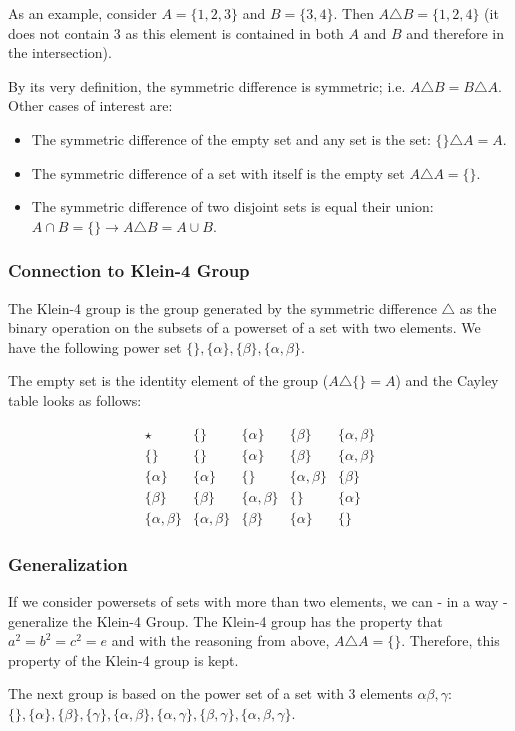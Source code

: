 As an example, consider \(A = \{1,2,3\}\) and \(B = \{3,4\}\). Then
\(A \triangle B = \{1,2,4\}\) (it does not contain \(3\) as this element
is contained in both \(A\) and \(B\) and therefore in the intersection).

By its very definition, the symmetric difference is symmetric; i.e.
\(A \triangle B = B \triangle A\). Other cases of interest are:

\begin{itemize}
\item
  The symmetric difference of the empty set and any set is the set:
  \(\{\} \triangle A = A\).
\item
  The symmetric difference of a set with itself is the empty set
  \(A \triangle A = \{\}\).
\item
  The symmetric difference of two disjoint sets is equal their union:
  \(A \cap B = \{\} \rightarrow A \triangle B = A \cup B\).
\end{itemize}

\subsubsection{Connection to Klein-4
Group}\label{connection-to-klein-4-group}

The Klein-4 group is the group generated by the symmetric difference
\(\triangle\) as the binary operation on the subsets of a powerset of a
set with two elements. We have the following power set
\(\{\}, \{\alpha\}, \{\beta\}, \{\alpha, \beta\}\).

The empty set is the identity element of the group
(\(A \triangle \{\} = A\)) and the Cayley table looks as follows:

\[
\begin{array}{c|cccc}
\star   & \{\}     & \{\alpha \}    & \{\beta\}   & \{\alpha, \beta\}     \\
\hline
\{\}       & \{\}     & \{\alpha\}    & \{\beta\}   & \{\alpha, \beta\}     \\
\{\alpha\}       & \{\alpha\}     & \{\}    & \{\alpha, \beta\}   & \{\beta\}     \\
\{\beta\} & \{\beta\}     & \{\alpha, \beta\}    & \{\}   & \{\alpha\}     \\
\{\alpha, \beta\}       & \{\alpha, \beta\}     & \{\beta\}    & \{\alpha\}   & \{\}
\end{array}
\]

\subsubsection{Generalization}\label{generalization}

If we consider powersets of sets with more than two elements, we can -
in a way - generalize the Klein-4 Group. The Klein-4 group has the
property that \(a^2 = b^2 = c^2 = e\) and with the reasoning from above,
\(A \triangle A = \{\}\). Therefore, this property of the Klein-4 group
is kept.

The next group is based on the power set of a set with 3 elements $\alpha \beta, \gamma:$\\ $\{\}, \{\alpha\}, \{\beta\}, \{\gamma\}, \{\alpha, \beta\}, \{\alpha, \gamma\}, \{\beta, \gamma\}, \{\alpha, \beta, \gamma\}$.
